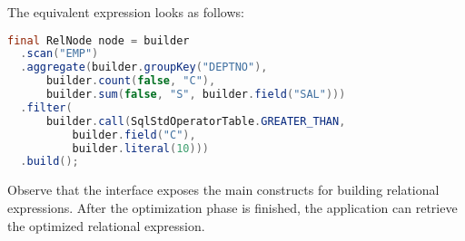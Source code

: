 The equivalent expression looks as follows:

\begin{lstlisting}[language=Java]
final RelNode node = builder
  .scan("EMP")
  .aggregate(builder.groupKey("DEPTNO"),
      builder.count(false, "C"),
      builder.sum(false, "S", builder.field("SAL")))
  .filter(
      builder.call(SqlStdOperatorTable.GREATER_THAN,
          builder.field("C"),
          builder.literal(10)))
  .build();
\end{lstlisting}

Observe that the interface exposes the main constructs for building relational expressions. After the optimization phase is finished, the application can retrieve the optimized relational expression.











